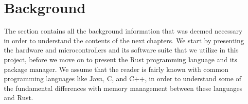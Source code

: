 
\chapter{Background}
\label{chap:background}

The section contains all the background information that was deemed necessary in order to understand the contents of the next chapters.
We start by presenting the hardware and microcontrollers and its software suite that we utilize in this project, before we move on to present the Rust programming language and its package manager.
We assume that the reader is fairly known with common programming languages like Java, C, and C++, in order to understand some of the fundamental differences with memory management between these languages and Rust.











